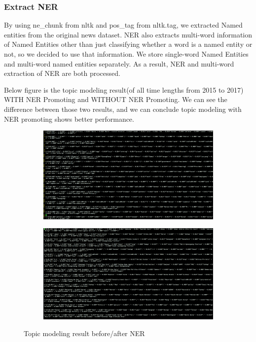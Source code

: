 \subsubsection{Extract NER}
By using ne\_chunk from nltk and pos\_tag from nltk.tag, we extracted Named entities from the original news dataset. NER also extracts multi-word information of Named Entities other than just classifying whether a word is a named entity or not, so we decided to use that information. We store single-word Named Entities and multi-word named entities separately. As a result, NER and multi-word extraction of NER are both processed.

Below figure is the topic modeling result(of all time lengths from 2015 to 2017) WITH NER Promoting and WITHOUT NER Promoting. We can see the difference between those two results, and we can conclude topic modeling with NER promoting shows better performance.
\begin{figure}[t]
    \centering
    \begin{subfigure}[b]{0.4\textwidth}
        \includegraphics[width=\linewidth]{before_ner.png}
    \end{subfigure}
    \begin{subfigure}[b]{0.4\textwidth}
        \includegraphics[width=\linewidth]{after_ner.png}
    \end{subfigure}
	\caption{Topic modeling result before/after NER}
\end{figure}

